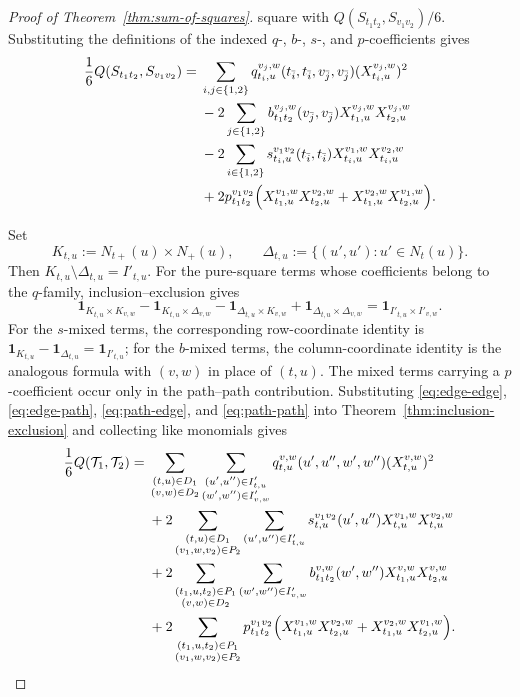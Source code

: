 \documentclass[pdflatex,sn-mathphys-num]{sn-jnl}
\theoremstyle{thmstyleone}
\begin{document}
\begin{proof}[Proof of Theorem~\ref{thm:sum-of-squares}]
square with $Q(S_{t_1t_2},S_{v_1v_2})/6$.  Substituting the definitions of the
indexed $q$-, $b$-, $s$-, and $p$-coefficients gives
\begin{align}
\frac16Q(S_{t_1t_2},S_{v_1v_2})
={}&\sum_{i,j\in\{1,2\}}
q_{t_i,u}^{v_j,w}(t_{\bar i},t_{\bar i},v_{\bar j},v_{\bar j})
(X_{t_i,u}^{v_j,w})^2                                         \notag\\
&-2\sum_{j\in\{1,2\}}
b_{t_1t_2}^{v_j,w}(v_{\bar j},v_{\bar j})
X_{t_1,u}^{v_j,w}X_{t_2,u}^{v_j,w}                             \notag\\
&-2\sum_{i\in\{1,2\}}
s_{t_i,u}^{v_1v_2}(t_{\bar i},t_{\bar i})
X_{t_i,u}^{v_1,w}X_{t_i,u}^{v_2,w}                             \notag\\
&+2p_{t_1t_2}^{v_1v_2}
\Bigl(X_{t_1,u}^{v_1,w}X_{t_2,u}^{v_2,w}
+X_{t_1,u}^{v_2,w}X_{t_2,u}^{v_1,w}\Bigr).             \label{eq:path-path}
\end{align}

Set
\[
K_{t,u}:=N_{t+}(u)\times N_+(u),
\qquad
\Delta_{t,u}:=\{(u',u'):u'\in N_t(u)\}.
\]
Then $K_{t,u}\setminus\Delta_{t,u}=I'_{t,u}$.  For the pure-square terms
whose coefficients belong to the $q$-family, inclusion--exclusion gives
\[
\mathbf 1_{K_{t,u}\times K_{v,w}}
-\mathbf 1_{K_{t,u}\times\Delta_{v,w}}
-\mathbf 1_{\Delta_{t,u}\times K_{v,w}}
+\mathbf 1_{\Delta_{t,u}\times\Delta_{v,w}}
=\mathbf 1_{I'_{t,u}\times I'_{v,w}}.
\]
For the $s$-mixed terms, the corresponding row-coordinate identity is
$\mathbf 1_{K_{t,u}}-\mathbf 1_{\Delta_{t,u}}=\mathbf 1_{I'_{t,u}}$; for
the $b$-mixed terms, the column-coordinate identity is the analogous formula
with $(v,w)$ in place of $(t,u)$.  The mixed terms carrying a
$p$-coefficient occur only in the path--path contribution.  Substituting
\eqref{eq:edge-edge},
\eqref{eq:edge-path}, \eqref{eq:path-edge}, and \eqref{eq:path-path} into
Theorem~\ref{thm:inclusion-exclusion} and collecting like monomials gives
\begin{align}
\frac16Q(\mathcal T_1,\mathcal T_2)
={}&\sum_{\substack{(t,u)\in D_1\\(v,w)\in D_2}}
\sum_{\substack{(u',u'')\in I'_{t,u}\\(w',w'')\in I'_{v,w}}}
q_{t,u}^{v,w}(u',u'',w',w'')(X_{t,u}^{v,w})^2                 \notag\\
&+2\sum_{\substack{(t,u)\in D_1\\(v_1,w,v_2)\in P_2}}
\sum_{(u',u'')\in I'_{t,u}}
s_{t,u}^{v_1v_2}(u',u'')X_{t,u}^{v_1,w}X_{t,u}^{v_2,w}        \notag\\
&+2\sum_{\substack{(t_1,u,t_2)\in P_1\\(v,w)\in D_2}}
\sum_{(w',w'')\in I'_{v,w}}
b_{t_1t_2}^{v,w}(w',w'')X_{t_1,u}^{v,w}X_{t_2,u}^{v,w}        \notag\\
&+2\sum_{\substack{(t_1,u,t_2)\in P_1\\(v_1,w,v_2)\in P_2}}
p_{t_1t_2}^{v_1v_2}
\Bigl(X_{t_1,u}^{v_1,w}X_{t_2,u}^{v_2,w}
+X_{t_1,u}^{v_2,w}X_{t_2,u}^{v_1,w}\Bigr).            \label{eq:raw-quadratic}
\end{align}


\end{proof}
\end{document}

